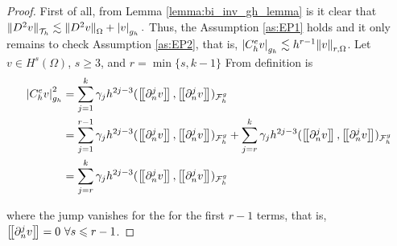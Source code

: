 \begin{proof}
    First of all, from Lemma \ref{lemma:bi_inv_gh_lemma} is it clear that \(
    \| D^2v \|_{ \mathcal{T} _{h} }^{  }  \lesssim \| D^2 v \|_{ \Omega   }^{  } + \left\lvert  v  \right\rvert _{g_{h}}.
    \)
    Thus, the Assumption \ref{as:EP1} holds and it only remains to check Assumption \ref{as:EP2}, that is, $ \left\lvert  C^{e}_{h} v  \right\rvert_{g_{h}} \lesssim h^{r-1} \| v \|_{r, \Omega   }^{  }$.
    Let $v  \in H^{s}( \Omega ) $, $s\ge 3$,  and $r = \min\{s,k-1\} $
    From definition is \[
        \begin{split}
        \abs{ C^{e}_{h} v }_{g_{h}}^{2} & = \sum_{j=1}^{k}  \gamma _{j} h^{2j-3} ( \jump{ \partial ^{j}_{n} v }, \jump{ \partial ^{j}_{n} v }  ) _{\mathcal{F}_{h}^{g} } \\
& = \sum_{j=1}^{r-1}  \gamma _{j} h^{2j-3} ( \jump{ \partial ^{j}_{n} v }, \jump{ \partial ^{j}_{n} v }  ) _{\mathcal{F}_{h}^{g} } + \sum_{j=r}^{k}  \gamma _{j} h^{2j-3} ( \jump{ \partial ^{j}_{n} v }, \jump{ \partial ^{j}_{n} v }  ) _{\mathcal{F}_{h}^{g} } \\
&= \sum_{j=r}^{k}  \gamma _{j} h^{2j-3} ( \jump{ \partial ^{j}_{n} v }, \jump{ \partial ^{j}_{n} v }  ) _{\mathcal{F}_{h}^{g} } \\
        \end{split}
    \]

    where the jump vanishes for the for the first $r-1$ terms, that is,  $\left[\!\left[  \partial ^{j}_{n} v  \right]\!\right] = 0  \  \forall s \leqslant r-1$.





\end{proof}
